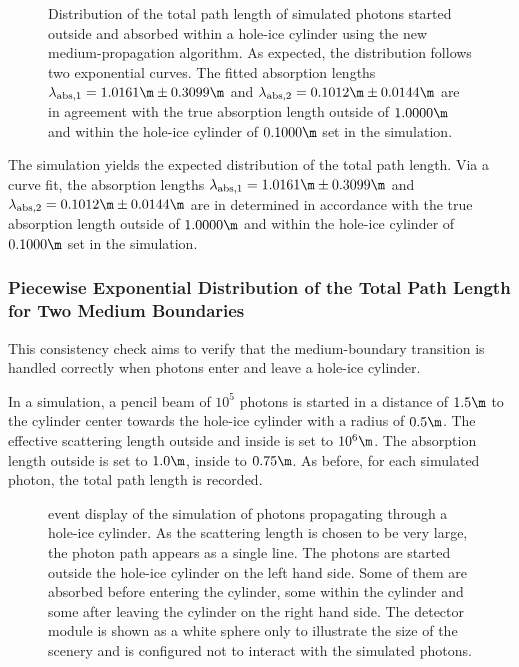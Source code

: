 \begin{figure}
  \caption{Distribution of the total path length of simulated photons started outside and absorbed within a hole-ice cylinder using the new medium-propagation algorithm. As expected, the distribution follows two exponential curves. The fitted absorption lengths $\lambda_\text{abs,1} = 1.0161\m \pm 0.3099\m$ and $\lambda_\text{abs,2} = 0.1012\m \pm 0.0144\m$ are in agreement with the true absorption length outside of $1.0000\m$ and within the hole-ice cylinder of $0.1000\m$ set in the simulation.}
\end{figure}

The simulation yields the expected distribution of the total path length. Via a curve fit, the absorption lengths $\lambda_\text{abs,1} = 1.0161\m \pm 0.3099\m$ and $\lambda_\text{abs,2} = 0.1012\m \pm 0.0144\m$ are in determined in accordance with the true absorption length outside of $1.0000\m$ and within the hole-ice cylinder of $0.1000\m$ set in the simulation.



\subsubsection{Piecewise Exponential Distribution of the Total Path Length for Two Medium Boundaries}


This consistency check aims to verify that the medium-boundary transition is handled correctly when photons enter and leave a hole-ice cylinder.

In a simulation, a pencil beam of $10^5$ photons is started in a distance of $1.5\m$ to the cylinder center towards the hole-ice cylinder with a radius of $0.5\m$. The effective scattering length outside and inside is set to $10^6\m$. The absorption length outside is set to $1.0\m$, inside to $0.75\m$.
As before, for each simulated photon, the total path length is recorded.


\begin{figure}
  \caption{\steamshovel event display of the simulation of photons propagating through a hole-ice cylinder. As the scattering length is chosen to be very large, the photon path appears as a single line.  The photons are started outside the hole-ice cylinder on the left hand side. Some of them are absorbed before entering the cylinder, some within the cylinder and some after leaving the cylinder on the right hand side. The detector module is shown as a white sphere only to illustrate the size of the scenery and is configured not to interact with the simulated photons.}
\end{figure}

